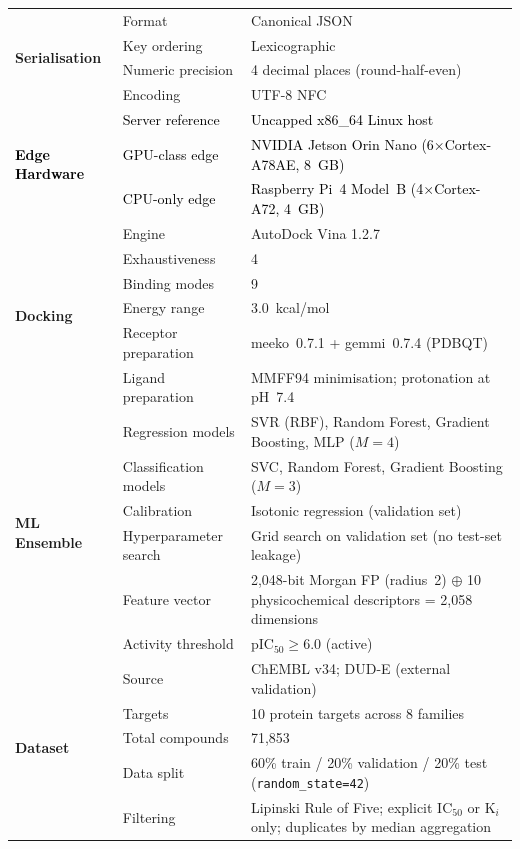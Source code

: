 \documentclass[conference]{IEEEtran}
\begin{document}
\begin{table}[!htbp]
{\begin{tabular}{p{2.6cm} p{2.8cm} p{4.5cm}}
\midrule
\multirow{4}{*}{\textbf{Serialisation}}
  & Format                & Canonical JSON \\
  & Key ordering          & Lexicographic \\
  & Numeric precision     & 4 decimal places (round-half-even) \\
  & Encoding              & UTF-8 NFC \\

\midrule
\multirow{3}{*}{\textcolor{black}{\textbf{Edge Hardware}}}
  & \textcolor{black}{Server reference} & \textcolor{black}{Uncapped x86\_64 Linux host} \\
  & \textcolor{black}{GPU-class edge}   & \textcolor{black}{NVIDIA Jetson Orin Nano (6$\times$Cortex-A78AE, 8~GB)} \\
  & \textcolor{black}{CPU-only edge}    & \textcolor{black}{Raspberry Pi~4 Model~B (4$\times$Cortex-A72, 4~GB)} \\

\midrule
\multirow{6}{*}{\textbf{Docking}}
  & Engine                & AutoDock Vina 1.2.7 \\
  & Exhaustiveness        & 4 \\
  & Binding modes         & 9 \\
  & Energy range          & 3.0~kcal/mol \\
  & Receptor preparation  & meeko~0.7.1 + gemmi~0.7.4 (PDBQT) \\
  & Ligand preparation    & MMFF94 minimisation; protonation at pH~7.4 \\

\midrule
\multirow{6}{*}{\textbf{ML Ensemble}}
  & Regression models     & SVR (RBF), Random Forest, Gradient Boosting, MLP ($M{=}4$) \\
  & Classification models & SVC, Random Forest, Gradient Boosting ($M{=}3$) \\
  & Calibration           & Isotonic regression (validation set) \\
  & Hyperparameter search & Grid search on validation set (no test-set leakage) \\
  & Feature vector        & 2{,}048-bit Morgan FP (radius~2) $\oplus$ 10 physicochemical
                           descriptors = 2{,}058 dimensions \\
  & Activity threshold    & pIC$_{50} \geq 6.0$ (active) \\

\midrule
\multirow{5}{*}{\textbf{Dataset}}
  & Source                & ChEMBL v34; DUD-E (external validation) \\
  & Targets               & 10 protein targets across 8 families \\
  & Total compounds       & 71{,}853 \\
  & Data split            & 60\% train / 20\% validation / 20\% test
                           (\texttt{random\_state=42}) \\
  & Filtering             & Lipinski Rule of Five; explicit IC$_{50}$ or
                           K$_i$ only; duplicates by median aggregation \\


\end{tabular}}
\end{table}
\end{document}
